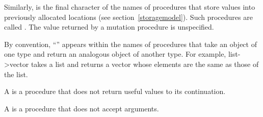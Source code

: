 Similarly, \ide{!} is the final character of the names
of procedures that store values into previously
allocated locations (see section~\ref{storagemodel}).
Such procedures are called .
The value returned by a mutation procedure is unspecified.

By convention, ``\ide{->}'' appears within the names of procedures that
take an object of one type and return an analogous object of another type.
For example, {\cf list->vector} takes a list and returns a vector whose
elements are the same as those of the list.

A  is a procedure that does not return useful values
to its continuation.
	
A  is a procedure that does not accept arguments.
